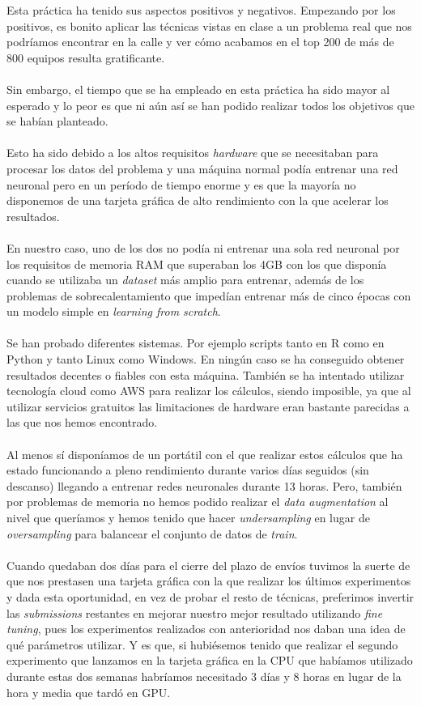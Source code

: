 Esta práctica ha tenido sus aspectos positivos y negativos. Empezando por los positivos, es bonito aplicar las técnicas vistas en clase a un problema real que nos podríamos encontrar en la calle y ver cómo acabamos en el top 200 de más de 800 equipos resulta gratificante.
\\ \\
Sin embargo, el tiempo que se ha empleado en esta práctica ha sido mayor al esperado y lo peor es que ni aún así se han podido realizar todos los objetivos que se habían planteado.
\\ \\
Esto ha sido debido a los altos requisitos \textit{hardware} que se necesitaban para procesar los datos del problema y una máquina normal podía entrenar una red neuronal pero en un período de tiempo enorme y es que la mayoría no disponemos de una tarjeta gráfica de alto rendimiento con la que acelerar los resultados.
\\ \\
En nuestro caso, uno de los dos no podía ni entrenar una sola red neuronal por los requisitos de memoria RAM que superaban los 4GB con los que disponía cuando se utilizaba un \textit{dataset} más amplio para entrenar, además de los problemas de sobrecalentamiento que impedían entrenar más de cinco épocas con un modelo simple en \textit{learning from scratch}.
\\ \\
Se han probado diferentes sistemas. Por ejemplo scripts tanto en R como en Python y tanto Linux como Windows. En ningún caso se ha conseguido obtener resultados decentes o fiables con esta máquina.
También se ha intentado utilizar tecnología cloud como AWS para realizar los cálculos, siendo imposible, ya que al utilizar servicios gratuitos las limitaciones de hardware eran bastante parecidas a las que nos hemos encontrado.
\\ \\
Al menos sí disponíamos de un portátil con el que realizar estos cálculos que ha estado funcionando a pleno rendimiento durante varios días seguidos (sin descanso) llegando a entrenar redes neuronales durante 13 horas. Pero, también por problemas de memoria no hemos podido realizar el \textit{data augmentation} al nivel que queríamos y hemos tenido que hacer \textit{undersampling} en lugar de \textit{oversampling} para balancear el conjunto de datos de \textit{train}.
\\ \\
Cuando quedaban dos días para el cierre del plazo de envíos tuvimos la suerte de que nos prestasen una tarjeta gráfica con la que realizar los últimos experimentos y dada esta oportunidad, en vez de probar el resto de técnicas, preferimos invertir las \textit{submissions} restantes en mejorar nuestro mejor resultado utilizando \textit{fine tuning}, pues los experimentos realizados con anterioridad nos daban una idea de qué parámetros utilizar. Y es que, si hubiésemos tenido que realizar el segundo experimento que lanzamos en la tarjeta gráfica en la CPU que habíamos utilizado durante estas dos semanas habríamos necesitado 3 días y 8 horas en lugar de la hora y media que tardó en GPU.
